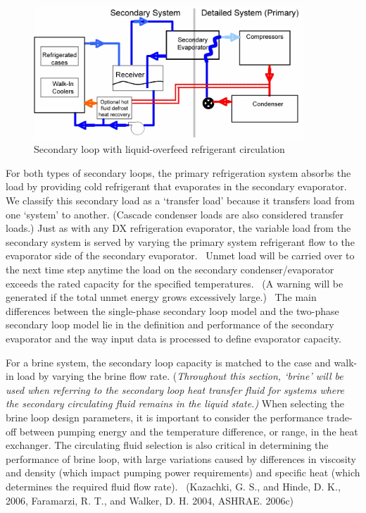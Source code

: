 \begin{figure}[hbtp] %
\centering
\includegraphics[width=0.9\textwidth, height=0.9\textheight, keepaspectratio=true]{media/image6324.png}
\caption{Secondary loop with liquid-overfeed refrigerant circulation \protect \label{fig:secondary-loop-with-liquid-overfeed}}
\end{figure}

For both types of secondary loops, the primary refrigeration system absorbs the load by providing cold refrigerant that evaporates in the secondary evaporator.~ We classify this secondary load as a `transfer load' because it transfers load from one `system' to another. (Cascade condenser loads are also considered transfer loads.) Just as with any DX refrigeration evaporator, the variable load from the secondary system is served by varying the primary system refrigerant flow to the evaporator side of the secondary evaporator.~ Unmet load will be carried over to the next time step anytime the load on the secondary condenser/evaporator exceeds the rated capacity for the specified temperatures.~ (A warning will be generated if the total unmet energy grows excessively large.) ~The main differences between the single-phase secondary loop model and the two-phase secondary loop model lie in the definition and performance of the secondary evaporator and the way input data is processed to define evaporator capacity.

For a brine system, the secondary loop capacity is matched to the case and walk-in load by varying the brine flow rate. (\emph{Throughout this section, `brine' will be used when referring to the secondary loop heat transfer fluid for systems where the secondary circulating fluid remains in the liquid state.)} When selecting the brine loop design parameters, it is important to consider the performance trade-off between pumping energy and the temperature difference, or range, in the heat exchanger. The circulating fluid selection is also critical in determining the performance of brine loop, with large variations caused by differences in viscosity and density (which impact pumping power requirements) and specific heat (which determines the required fluid flow rate). ~(Kazachki, G. S., and Hinde, D. K., 2006, Faramarzi, R. T., and Walker, D. H. 2004, ASHRAE. 2006c)

